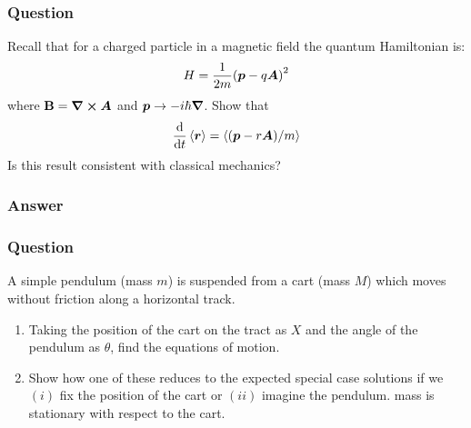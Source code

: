 \subsubsection{Question}
Recall that for a charged particle in a magnetic field the quantum Hamiltonian is:
\begin{equation*}
	H = \frac{1}{2m}\qty(\boldsymbol{p} - q\boldsymbol{A})^2
\end{equation*}
where $\mathbf{B} = \grad\cross \boldsymbol{A}$ and $\boldsymbol{p}\to - i\hbar\grad$. Show that
\begin{equation*}
	\dv{t}\expval{\boldsymbol{r}} = \expval{(\boldsymbol{p} - r\boldsymbol{A})/m}
\end{equation*}
Is this result consistent with classical mechanics?
\subsubsection{Answer}


\subsubsection{Question}
A simple pendulum (mass $m$) is suspended from a cart (mass $M$) which moves without friction along a horizontal track.
\begin{enumerate}
	\item Taking the position of the cart on the tract as $X$ and the angle of the pendulum as $\theta$, find the equations of motion.
	\item Show how one of these reduces to the expected special case solutions if we $(i)$ fix the position of the cart or $(ii)$ imagine the pendulum. mass is stationary with respect to the cart. 
\end{enumerate}
